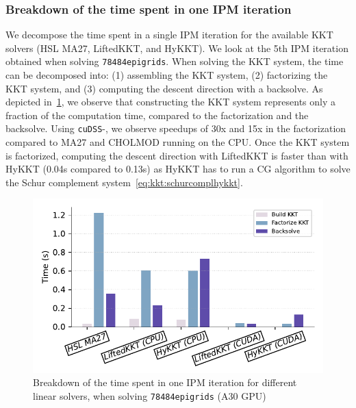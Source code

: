 \subsubsection{Breakdown of the time spent in one IPM iteration}
We decompose the time spent in a single
IPM iteration for the available KKT solvers (HSL MA27, LiftedKKT, and HyKKT).
We look at the 5th IPM iteration obtained when solving {\tt 78484epigrids}.
When solving the KKT system, the time can be decomposed into: (1) assembling the
KKT system, (2) factorizing the KKT system, and (3) computing the descent direction with a backsolve.
As depicted in~\ref{fig:timebreakdown}, we observe
that constructing the KKT system represents only a fraction of the computation time, compared
to the factorization and the backsolve. Using {\tt cuDSS}-\ldlt, we observe speedups of
30x and 15x in the factorization compared to MA27 and CHOLMOD running on the CPU.
Once the KKT system is factorized, computing the descent direction with LiftedKKT is faster than with HyKKT
(0.04s compared to 0.13s) as HyKKT has to run a CG algorithm to solve the Schur complement
system~\eqref{eq:kkt:schurcomplhykkt}.

\begin{figure}[!ht]
  \centering
  \includegraphics[width=.7\textwidth]{../figures/breakdown.pdf}
  \caption{Breakdown of the time spent in one IPM iteration
    for different linear solvers, when solving {\tt 78484epigrids} (A30 GPU)
  \label{fig:timebreakdown}}
\end{figure}



